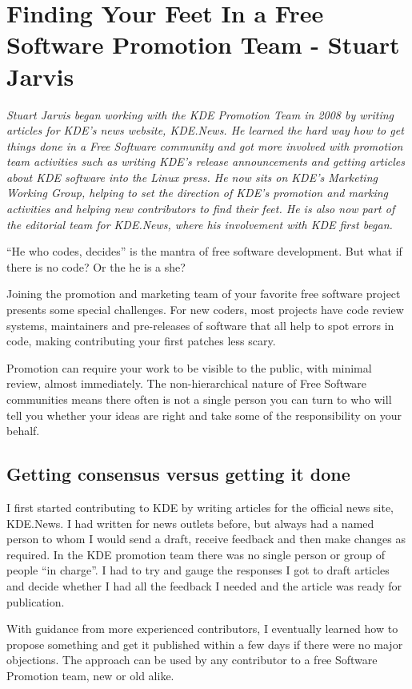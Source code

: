 \chapter{Finding Your Feet In a Free Software Promotion Team - Stuart Jarvis}

\textit{Stuart Jarvis began working with the KDE Promotion Team in 2008 by writing articles for KDE's news website, KDE.News. He learned the hard way how to get things done in a Free Software community and got more involved with promotion team activities such as writing KDE's release announcements and getting articles about KDE software into the Linux press. He now sits on KDE's Marketing Working Group, helping to set the direction of KDE's promotion and marking activities and helping new contributors to find their feet. He is also now part of the editorial team for KDE.News, where his involvement with KDE first began.}

``He who codes, decides'' is the mantra of free software development. But what if there is no code? Or the he is a she?

Joining the promotion and marketing team of your favorite free software project presents some special challenges. For new coders, most projects have code review systems, maintainers and pre-releases of software that all help to spot errors in code, making contributing your first patches less scary. 

Promotion can require your work to be visible to the public, with minimal review, almost immediately. The non-hierarchical nature of Free Software communities means there often is not a single person you can turn to who will tell you whether your ideas are right and take some of the responsibility on your behalf.

\section*{Getting consensus versus getting it done}

I first started contributing to KDE by writing articles for the official news site, KDE.News. I had written for news outlets before, but always had a named person to whom I would send a draft, receive feedback and then make changes as required. In the KDE promotion team there was no single person or group of people ``in charge''. I had to try and gauge the responses I got to draft articles and decide whether I had all the feedback I needed and the article was ready for publication.

With guidance from more experienced contributors, I eventually learned how to propose something and get it published within a few days if there were no major objections. The approach can be used by any contributor to a free Software Promotion team, new or old alike.

